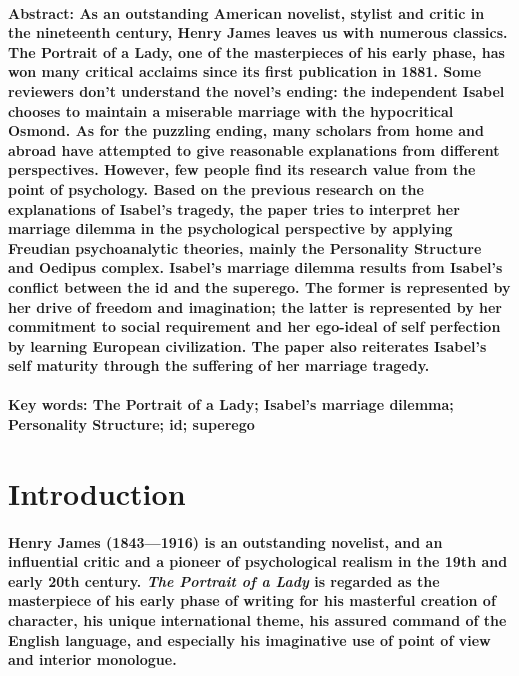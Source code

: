 \documentclass[UTF8]{ctexart}
\begin{document}
  \paragraph{
    \textbf{Abstract:} %
    As an outstanding American novelist, stylist and critic in the nineteenth century, Henry James leaves us with numerous classics. The Portrait of a Lady, one of the masterpieces of his early phase, has won many critical acclaims since its first publication in 1881. Some reviewers don't understand the novel's ending: the independent Isabel chooses to maintain a miserable marriage with the hypocritical Osmond. As for the puzzling ending, many scholars from home and abroad have attempted to give reasonable explanations from different perspectives. However, few people find its research value from the point of psychology. Based on the previous research on the explanations of Isabel's tragedy, the paper tries to interpret her marriage dilemma in the psychological perspective by applying Freudian psychoanalytic theories, mainly the Personality Structure and Oedipus complex. Isabel's marriage dilemma results from Isabel's conflict between the id and the superego. The former is represented by her drive of freedom and imagination; the latter is represented by her commitment to social requirement and her ego-ideal of self perfection by learning European civilization. The paper also reiterates Isabel's self maturity through the suffering of her marriage tragedy.
  }
  \paragraph{
    \textbf{Key words:}
    The Portrait of a Lady; Isabel's marriage dilemma; Personality Structure; id; superego
  }
  \newpage
  \section{Introduction}
  \paragraph{
    \hspace{4ex}Henry James (1843—1916) is an outstanding novelist, and an influential critic and a pioneer of psychological realism in the 19th and early 20th century. \emph{The Portrait of a Lady} is regarded as the masterpiece of his early phase of writing for his masterful creation of character, his unique international theme, his assured command of the English language, and especially his imaginative use of point of view and interior monologue.
  }
\end{document}
